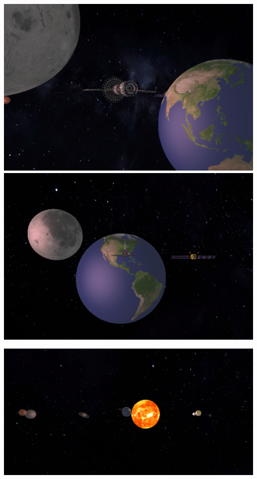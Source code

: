 \documentclass[12pt]{article}
\begin{document}
\begin{center}
	\includegraphics[scale = 0.4]{result/3.png}
	\includegraphics[scale = 0.4]{result/1.png}
	
	\includegraphics[scale = 0.8]{result/5.png}
\end{center}
	
\end{document}
